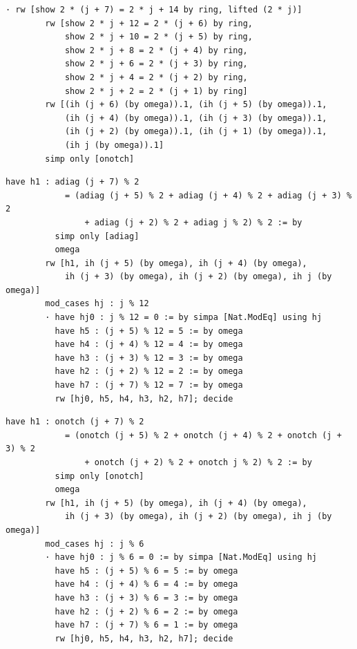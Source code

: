 \documentclass[11pt]{article}
\theoremstyle{definition}
\begin{document}
\begin{lstlisting}[caption={Even half of the inductive step of
Theorem~\ref{thm:interleave}, verbatim excerpt from
\texttt{final/01-comb07-diagnotch-proved.lean} (lines 179--190, sha256
\texttt{51721e9e}).},label={lst:t1main}]
      · rw [show 2 * (j + 7) = 2 * j + 14 by ring, lifted (2 * j)]
        rw [show 2 * j + 12 = 2 * (j + 6) by ring,
            show 2 * j + 10 = 2 * (j + 5) by ring,
            show 2 * j + 8 = 2 * (j + 4) by ring,
            show 2 * j + 6 = 2 * (j + 3) by ring,
            show 2 * j + 4 = 2 * (j + 2) by ring,
            show 2 * j + 2 = 2 * (j + 1) by ring]
        rw [(ih (j + 6) (by omega)).1, (ih (j + 5) (by omega)).1,
            (ih (j + 4) (by omega)).1, (ih (j + 3) (by omega)).1,
            (ih (j + 2) (by omega)).1, (ih (j + 1) (by omega)).1,
            (ih j (by omega)).1]
        simp only [onotch]
\end{lstlisting}

\begin{lstlisting}[caption={Core of Theorem~\ref{thm:pat2}: the modulo-$2$
collapse \texttt{h1} and the first residue branch, verbatim excerpt from
\texttt{final/01-comb07-diagnotch-proved.lean} (lines 215--229, sha256
\texttt{51721e9e}).},label={lst:t2core}]
        have h1 : adiag (j + 7) % 2
            = (adiag (j + 5) % 2 + adiag (j + 4) % 2 + adiag (j + 3) % 2
                + adiag (j + 2) % 2 + adiag j % 2) % 2 := by
          simp only [adiag]
          omega
        rw [h1, ih (j + 5) (by omega), ih (j + 4) (by omega),
            ih (j + 3) (by omega), ih (j + 2) (by omega), ih j (by omega)]
        mod_cases hj : j % 12
        · have hj0 : j % 12 = 0 := by simpa [Nat.ModEq] using hj
          have h5 : (j + 5) % 12 = 5 := by omega
          have h4 : (j + 4) % 12 = 4 := by omega
          have h3 : (j + 3) % 12 = 3 := by omega
          have h2 : (j + 2) % 12 = 2 := by omega
          have h7 : (j + 7) % 12 = 7 := by omega
          rw [hj0, h5, h4, h3, h2, h7]; decide
\end{lstlisting}

\begin{lstlisting}[caption={Core of Theorem~\ref{thm:pat6o}, verbatim excerpt
from \texttt{final/01-comb07-diagnotch-proved.lean} (lines 320--334, sha256
\texttt{51721e9e}); Theorem~\ref{thm:pat6e} has the same shape at lines
383--397.},label={lst:t3core}]
        have h1 : onotch (j + 7) % 2
            = (onotch (j + 5) % 2 + onotch (j + 4) % 2 + onotch (j + 3) % 2
                + onotch (j + 2) % 2 + onotch j % 2) % 2 := by
          simp only [onotch]
          omega
        rw [h1, ih (j + 5) (by omega), ih (j + 4) (by omega),
            ih (j + 3) (by omega), ih (j + 2) (by omega), ih j (by omega)]
        mod_cases hj : j % 6
        · have hj0 : j % 6 = 0 := by simpa [Nat.ModEq] using hj
          have h5 : (j + 5) % 6 = 5 := by omega
          have h4 : (j + 4) % 6 = 4 := by omega
          have h3 : (j + 3) % 6 = 3 := by omega
          have h2 : (j + 2) % 6 = 2 := by omega
          have h7 : (j + 7) % 6 = 1 := by omega
          rw [hj0, h5, h4, h3, h2, h7]; decide
\end{lstlisting}
\end{document}
